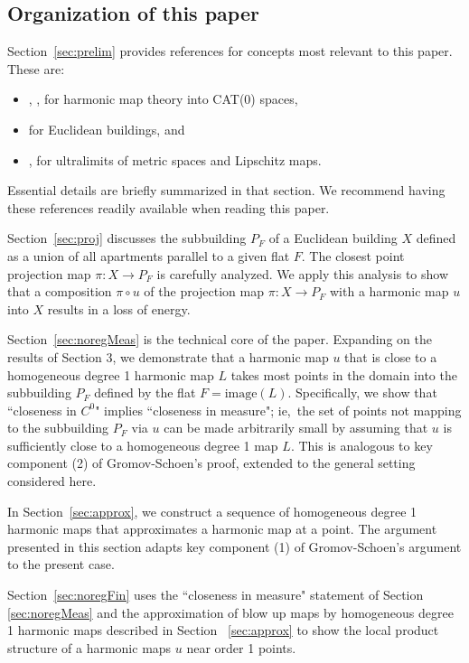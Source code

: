 \documentclass[12pt]{amsart}
\theoremstyle{definition}
\numberwithin{equation}{section}
\newcommand{\PF}{P_F}
\begin{document}
\subsection{Organization of this paper}
Section~\ref{sec:prelim} provides references for concepts most relevant to this paper.  These are:
\begin{itemize}
\item  \cite{gromov-schoen},  \cite{korevaar-schoen1}, \cite{korevaar-schoen2} for harmonic map theory into CAT(0) spaces,
\item \cite{kleiner-leeb} for Euclidean buildings, and 
\item \cite{kleiner-leeb}, \cite{lytchak} for ultralimits of metric spaces and Lipschitz maps.
\end{itemize}
Essential details are  briefly summarized in that section.  We recommend having these references readily available when reading this paper.

Section~\ref{sec:proj} discusses  the  subbuilding $\PF$ of a Euclidean building $X$  defined as a union of all apartments parallel to a given flat $F$. The closest point projection map $\pi: X \to \PF$ is carefully analyzed.  We apply this analysis to show that a composition $\pi \circ u$ of the projection map $\pi: X \rightarrow \PF$ with a harmonic map $u$ into $X$ results in a loss of energy.

Section~\ref{sec:noregMeas} is the technical core of the paper. Expanding on the results of Section 3, we demonstrate that a harmonic map $u$ that is close to a homogeneous degree 1 harmonic map $L$ takes most points in the domain  into the subbuilding $\PF$ defined by the flat $F=\text{image}(L)$.  Specifically, we show that ``closeness in $C^0$" implies ``closeness in measure"; ie,~the set of points not mapping to the subbuilding $\PF$ via $u$ can be made arbitrarily small by assuming that $u$ is sufficiently close to a homogeneous degree 1 map $L$. This is analogous to key component (2) of Gromov-Schoen's proof, extended to the general setting considered here.

In Section~\ref{sec:approx}, we construct a sequence of homogeneous degree 1 harmonic maps that approximates a harmonic map at a point.  The argument presented in this section adapts key component (1) of Gromov-Schoen's argument to the present case.



Section~\ref{sec:noregFin} uses the ``closeness in measure" statement of Section \ref{sec:noregMeas} and the approximation of blow up maps by homogeneous degree 1 harmonic maps described in Section~ \ref{sec:approx} to show the local product structure of a  harmonic maps $u$ near order 1 points.
 
\end{document}
